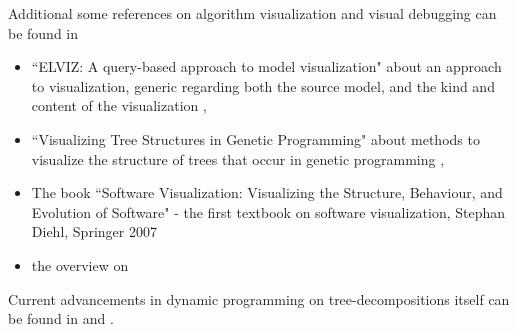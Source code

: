 \documentclass[a4paper, 12pt, bibliography=totoc]{scrartcl}
\begin{document}

Additional some references on algorithm visualization and visual debugging can be found in
\begin{itemize}
	\item ``ELVIZ: A query-based approach to model visualization" about an approach to visualization, generic regarding both the source model, and the kind and content of the visualization \cite{ELVIZ},
	
	\item ``Visualizing Tree Structures in Genetic Programming" about methods to visualize the structure of trees that occur in genetic programming \cite{VisuTDinGP},
	
	\item The book ``Software Visualization: Visualizing the Structure, Behaviour, and Evolution of Software" - the first textbook on software visualization, Stephan Diehl, Springer 2007 \cite{SoftwareVisualization}
	
	\item the overview on 
\end{itemize}

Current advancements in dynamic programming on tree-decompositions itself can be found in \cite{dpdbpadl2020} and \cite{taminghightw}.
%
\end{document}
